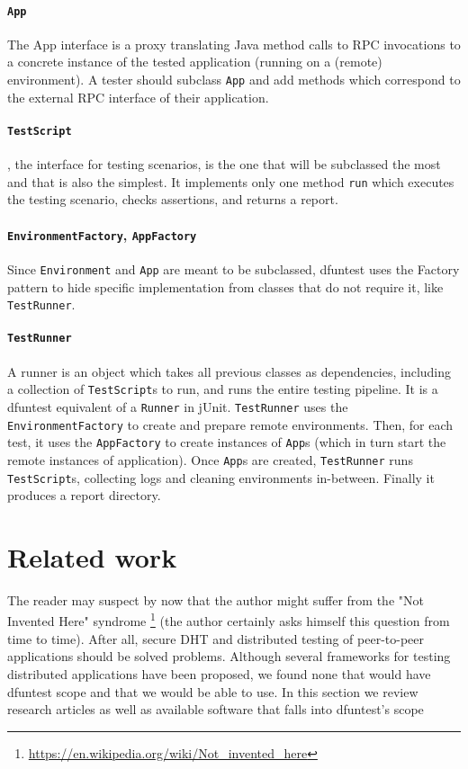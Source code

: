 \paragraph{\texttt{App}}
The App interface is a proxy translating Java method calls to RPC invocations to a concrete instance of the tested application (running on a (remote) environment).
A tester should subclass \texttt{App} and add methods which correspond to the external RPC interface of their application.

\paragraph{\texttt{TestScript}}, the interface for testing scenarios, is the one
that will be subclassed the most and that is also the simplest. It implements
only one method \texttt{run} which executes the testing scenario, checks
assertions, and returns a report.

\paragraph{\texttt{EnvironmentFactory}, \texttt{AppFactory}} Since
\texttt{Environment} and \texttt{App} are meant to be subclassed, dfuntest uses
the Factory pattern to hide specific implementation from classes that do not require
it, like \texttt{TestRunner}.

\paragraph{\texttt{TestRunner}} A runner is an object which takes all previous
classes as dependencies, including a collection of \texttt{TestScript}s to run,
and runs the entire testing pipeline. It is a dfuntest equivalent of a
\texttt{Runner} in jUnit.
\texttt{TestRunner} uses the \texttt{EnvironmentFactory} to
create and prepare remote environments. Then, for each test, it uses the
\texttt{AppFactory} to create instances of \texttt{App}s (which in turn start
the remote instances of application). Once \texttt{App}s are created,
\texttt{TestRunner} runs \texttt{TestScript}s, collecting logs and cleaning
environments in-between. Finally it produces a report directory.

\section{Related work}
The reader may suspect by now that the author might suffer from the "Not Invented Here" syndrome \footnote{\url{https://en.wikipedia.org/wiki/Not\_invented\_here}} (the author certainly asks himself this question from time to time).
After all, secure DHT and distributed testing of peer-to-peer applications should be solved problems.
Although several frameworks for testing distributed applications have been
proposed, we found none that would have dfuntest scope and that we would be able
to use.
In this section we review research articles as well as available software that falls into dfuntest's scope

